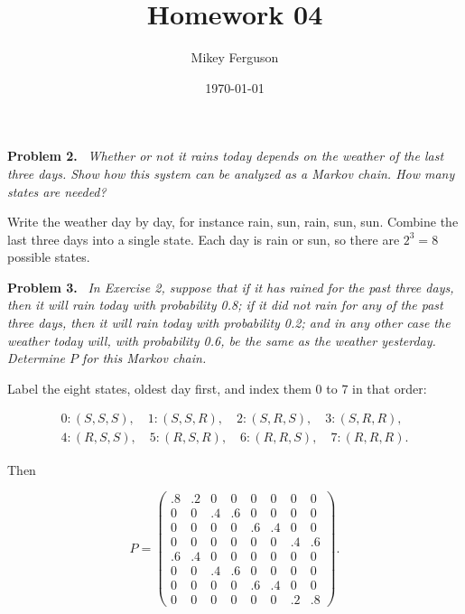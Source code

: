 \documentclass[11pt]{article}
\title{Homework 04}
\author{Mikey Ferguson}
\date{\today}
\newenvironment{problem}[1]
  {\par\medskip\noindent\textbf{Problem #1.}\ \itshape}
  {\par\medskip}
\begin{document}
\maketitle


\begin{problem}{2}
Whether or not it rains today depends on the weather of the last three days. Show how this system can be analyzed as a Markov chain. How many states are needed?
\end{problem}
Write the weather day by day, for instance rain, sun, rain, sun, sun. Combine the last three days into a single state. Each day is rain or sun, so there are $2^3 = 8$ possible states.

\begin{problem}{3}
In Exercise 2, suppose that if it has rained for the past three days, then it will rain today with probability 0.8; if it did not rain for any of the past three days, then it will rain today with probability 0.2; and in any other case the weather today will, with probability 0.6, be the same as the weather yesterday. Determine $P$ for this Markov chain.
\end{problem}
Label the eight states, oldest day first, and index them $0$ to $7$ in that order:

$$\begin{gathered} 0:(S,S,S),\quad 1:(S,S,R),\quad 2:(S,R,S),\quad 3:(S,R,R), \\ 4:(R,S,S),\quad 5:(R,S,R),\quad 6:(R,R,S),\quad 7:(R,R,R). \end{gathered}$$

Then

$$P = \begin{pmatrix}
.8 & .2 & 0 & 0 & 0 & 0 & 0 & 0 \\
0 & 0 & .4 & .6 & 0 & 0 & 0 & 0 \\
0 & 0 & 0 & 0 & .6 & .4 & 0 & 0 \\
0 & 0 & 0 & 0 & 0 & 0 & .4 & .6 \\
.6 & .4 & 0 & 0 & 0 & 0 & 0 & 0 \\
0 & 0 & .4 & .6 & 0 & 0 & 0 & 0 \\
0 & 0 & 0 & 0 & .6 & .4 & 0 & 0 \\
0 & 0 & 0 & 0 & 0 & 0 & .2 & .8
\end{pmatrix}.$$
\end{document}
